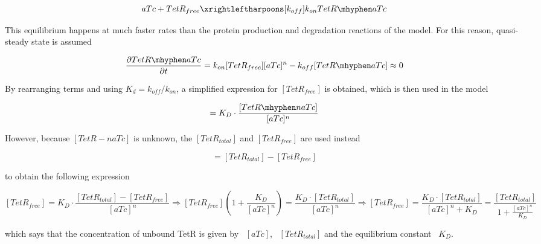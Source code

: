 \begin{equation}
    aTc + TetR_{free} \xrightleftharpoons[k_{off}]{k_{on}} TetR \mhyphen aTc
\end{equation}

This equilibrium happens at much faster rates than the protein production and degradation reactions of the model.
For this reason, quasi-steady state is assumed

\begin{equation}
    \pdv{TetR \mhyphen aTc}{t} = k_{on}[TetR_{free}][aTc]^n - k_{off}[TetR \mhyphen aTc] \approx 0
\end{equation}


By rearranging terms and using $K_{d} = k_{off}/k_{on}$, a simplified expression for $[TetR_{free}]$ is obtained, which is then used in the model

\begin{equation}
[TetR_{free}] = K_{D}\cdot \frac{[TetR \mhyphen naTc]}{[aTc]^n}
\end{equation}

However, because $[TetR-naTc]$ is unknown, the $[TetR_{total}]$ and $[TetR_{free}]$ are used instead

\begin{equation}
[TetR \mhyphen naTc] = [TetR_{total}] - [TetR_{free}]
\end{equation}

to obtain the following expression

\begin{subequations}
    \begin{equation}
    [TetR_{free}] = K_{D} \cdot \frac{[TetR_{total}] - [TetR_{free}]}{[aTc]^n} \Longrightarrow
    \end{equation}
    \begin{equation}
    [TetR_{free}] (1+\frac{K_{D}}{[aTc]^n}) = \frac{K_{D}\cdot [TetR_{total}]}{[aTc]^n}\Longrightarrow
    \end{equation}
    \begin{equation}
    [TetR_{free}] = \frac{K_{D}\cdot[TetR_{total}]}{[aTc]^n+K_{D}} = \frac{[TetR_{total}]}{1+\frac{[aTc]^n}{K_{D}}}
    \end{equation}
\end{subequations}

which says that the concentration of unbound TetR is given by ~$[aTc]$, ~$[TetR_{total}]$ and the equilibrium constant ~$K_{D}$.

